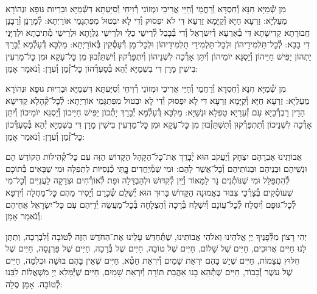 \documentclass[twoside, openany, parskip=half, 11pt]{book}
\begin{document}

\shabbos\\
מִן שְׁ֯מַיָּא חִנָּא וְ֯חִסְדָּא וְ֯רַחֲמֵי וְ֯חַיֵּי אֲרִיכֵי וּמְזוֹנֵי רְ֯וִיחֵי וְ֯סִיַּעְתָּא דִשְּׁ֯מַיָּא וּבַרְיוּת גּוּפָא וּנְהוֹרָא מַעַלְיָא: זַרְעָא חַיָּא וְ֯קַיָּמָא זַרְעָא דִּי לֹא יִפְסוּק וְ֯דִי לָא יִבְטוּל מִפִּתְגָּמֵי אוֹרַיְתָא: לְ֯מָרָנָן וְ֯רַבָּנָן חֲבוּרָתָא קַדִּישָׁתָא דִּי בְ֯אַרְעָא דְ֯יִשְׂרָאֵל וְ֯דִי בְּ֯בָבֶל לְ֯רֵישֵׁי כַלֵּי וּלְרֵישֵׁי גַלְוָתָא וּלְרֵישֵׁי מְ֯תִיבָתָא וּלְדַיָּנֵי דִי בָבָא: לְ֯כׇל־תַּלְמִידֵיהוֹן וּלְכׇל־תַּלְמִידֵי תַלְמִידֵיהוֹן וּלְכׇל־מָן דְּ֯עָסְ֯קִין בְּ֯אוֹרַיְתָא: מַלְכָּא דְ֯עָלְ֯מָא יְ֯בָרֵךְ יַתְהוֹן יַפִּישׁ חַיֵּיהוֹן וְ֯יַסְגֵּא יוֹמֵיהוֹן וְ֯יִתֵּן אָרְ֯כָה לִשְׁנֵיהוֹן וְ֯יִתְפָּרְ֯קוּן וְ֯יִשְׁתֵּזְ֯בוּן מִן כׇּל־עָקָא וּמִן כׇּל־מַרְעִין בִּישִׁין מָרָן דִּי בִשְׁמַיָּא יְ֯הֵא בְּ֯סַעְדְּ֯הוֹן כׇּל־זְ֯מַן וְ֯עִדָּן: וְ֯נֹאמַר אָמֵן:



מִן שְׁ֯מַיָּא חִנָּא וְ֯חִסְדָּא וְ֯רַחֲמֵי וְ֯חַיֵּי אֲרִיכֵי וּמְזוֹנֵי רְ֯וִיחֵי וְ֯סִיַּעְתָּא דִּשְׁמַיָּא וּבַרְיוּת גּוּפָא וּנְהוֹרָא מַעַלְיָא: זַרְעָא חַיָּא וְ֯קַיָּמָא זַרְעָא דִּי לָא יִפְסוּק וְ֯דִי לָא יִבְטוּל מִפִּתְגָּמֵי אוֹרַיְתָא: לְ֯כׇל־קְ֯הָלָא קַדִּישָׁא הָדֵין רַבְרְ֯בַיָּא עִם זְ֯עֵרַיָּא טַפְלָא וּנְשַׁיָּא: מַלְכָּא דְ֯עָלְ֯מָא יְ֯בָרֵךְ יָתְ֯כוֹן יַפִּישׁ חַיֵּיכוֹן וְ֯יַסְגֵּא יוֹמֵיכוֹן וְ֯יִתֵּן אָרְ֯כָה לִשְׁנֵיכוֹן וְ֯תִתְפָּרְ֯קוּן וְ֯תִשְׁתֵּזְ֯בוּן מִן כׇּל־עָקָא וּמִן כׇּל־מַרְעִין בִּישִׁין מָרָן דִּי בִשְׁמַיָּא יְ֯הֵא בְּ֯סַעְדְּ֯כוֹן כׇּל־זְ֯מַן וְ֯עִדָּן: וְ֯נֹאמַר אָמֵן:

אֲבוֹתֵֽינוּ אַבְרָהָם יִצְחָק וְ֯יַעֲקֹב הוּא יְ֯בָרֵךְ אֶת־כׇּל־הַקָּהָל הַקָּדוֹשׁ הַזֶּה עִם כׇּל־קְ֯הִילּוֹת הַקּוֹדֶשׁ הֵם וּנְשֵׁיהֶם וּבְנֵיהֶם וּבְנוֹתֵיהֶם וְ֯כׇל־אֲשֶׁר לָהֶם: וּמִי שֶׁמְּ֯יַחֲדִים בׇׇׇׇּתֵּי כְ֯נֵסִיּוֹת לִתְפִלָּה וּמִי שֶׁבָּאִים בְּ֯תוֹכָם לְ֯הִתְפַּלֵּל וּמִי שֶׁנּוֹתְ֯נִים נֵר לַמָּאוֹר וְ֯יַֽיִן לְ֯קִדּוּשׁ וּלְהַבְדָּלָה וּפַת לְ֯אוֹרְ֯חִים וּצְדָקָה לַעֲנִיִּים וְ֯כׇל־מִי שֶׁעוֹסְ֯קִים בְּ֯צָרְ֯כֵי צִבּוּר בֶּאֱמוּנָה הַקָּדוֹשׁ בָּרוּךְ הוּא יְ֯שַׁלֵם שְׂ֯כָרָם וְ֯יָסִיר מֵהֶם כׇּל־מַחֲלָה וְ֯יִרְפָּא לְ֯כׇל־גּוּפָם וְ֯יִסְלַח לְ֯כׇל־עֲוֹנָם וְ֯יִשְׁלַח בְּ֯רָכָה וְ֯הַצְלָחָה בְּ֯כׇל־מַעֲשֵׂה יְ֯דֵיהֶם עִם כָּל־יִשְׂרָאֵל אֲחֵיהֶם וְ֯נֹאמַר אָמֵן:







יְהִי רָצוֹן מִלְּ֯פָנֶיךָ יְיָ אֱלֹהֵינוּ וֵאלֹהֵי אֲבוֹתֵינוּ,
שֶׁתְּ֯חַדֵּשׁ עָלֵינוּ אֶת־הַחֹדֶשׁ הַזֶּה לְ֯טוֹבָה וְ֯לִבְרָכָה,
וְתִתֶּן לָנוּ חַיִּים אֲרוּכִים,
חַיִּים שֶׁל שָׁלוֹם,
חַיִּים שֶׁל טוֹבָה,
חַיִּים שֶׁל בְּ֯רָכָה,
חַיִּים שֶׁל פַּרְנָסָה,
חַיִּים שֶׁל חִלּוּץ עֲצָמוֹת,
חַיִּים שֶׁיֵשׁ בָּהֶם יִרְאַת שָׁמַיִם וְ֯יִרְאַת חֵטְ֯א,
חַיִּים שֶׁאֵין בָּהֶם בּוּשָׁה וּכְלִמָּה,
חַיִּים שֶׁל עשֶׁר וְ֯כָבוֹד,
חַיִּים שֶׁתְּ֯הֵא בָנוּ אַהֲבַת תּוֹרָה וְ֯יִרְאַת שָׁמַיִם,
חַיִּים שֶׁיְּ֯מַּלֵא יְיָ מִשְׁאֲלוֹת לִבֵּנוּ לְ֯טוֹבָה. אָמֵן סֶלָה:
\end{document}
